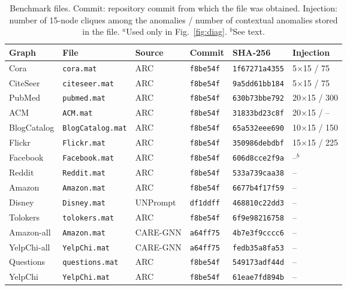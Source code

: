 \documentclass[pdflatex,sn-mathphys-ay]{sn-jnl}
\theoremstyle{plain}
\theoremstyle{remark}
\begin{document}
\begin{appendices}
\begin{table}[h]
\caption{Benchmark files. Commit: repository commit from which the file was obtained. Injection: number of 15-node cliques among the anomalies / number of contextual anomalies stored in the file. $^{a}$Used only in Fig.~\ref{fig:diag}. $^{b}$See text.}
\label{tab:files}
\scriptsize
\setlength{\tabcolsep}{2pt}
\begin{tabular*}{\textwidth}{@{\extracolsep{\fill}}llllll@{}}
\toprule
Graph & File & Source & Commit & SHA-256 & Injection \\
\midrule
Cora & \texttt{cora.mat} & ARC & \texttt{f8be54f} & \texttt{1f67271a4355} & 5$\times$15 / 75 \\
CiteSeer & \texttt{citeseer.mat} & ARC & \texttt{f8be54f} & \texttt{9a5dd61bb184} & 5$\times$15 / 75 \\
PubMed & \texttt{pubmed.mat} & ARC & \texttt{f8be54f} & \texttt{630b73bbe792} & 20$\times$15 / 300 \\
ACM & \texttt{ACM.mat} & ARC & \texttt{f8be54f} & \texttt{31833bd23c8f} & 20$\times$15 / -- \\
BlogCatalog & \texttt{BlogCatalog.mat} & ARC & \texttt{f8be54f} & \texttt{65a532eee690} & 10$\times$15 / 150 \\
Flickr & \texttt{Flickr.mat} & ARC & \texttt{f8be54f} & \texttt{350986debdbf} & 15$\times$15 / 225 \\
Facebook & \texttt{Facebook.mat} & ARC & \texttt{f8be54f} & \texttt{606d8cce2f9a} & --$^{b}$ \\
Reddit & \texttt{Reddit.mat} & ARC & \texttt{f8be54f} & \texttt{533a739caa38} & -- \\
Amazon & \texttt{Amazon.mat} & ARC & \texttt{f8be54f} & \texttt{6677b4f17f59} & -- \\
Disney & \texttt{Disney.mat} & UNPrompt & \texttt{df1ddff} & \texttt{468810c22dd3} & -- \\
Tolokers & \texttt{tolokers.mat} & ARC & \texttt{f8be54f} & \texttt{6f9e98216758} & -- \\
Amazon-all & \texttt{Amazon.mat} & CARE-GNN & \texttt{a64ff75} & \texttt{4b7e3f9cccc6} & -- \\
YelpChi-all & \texttt{YelpChi.mat} & CARE-GNN & \texttt{a64ff75} & \texttt{fedb35a8fa53} & -- \\
Questions & \texttt{questions.mat} & ARC & \texttt{f8be54f} & \texttt{549173adf44d} & -- \\
YelpChi & \texttt{YelpChi.mat} & ARC & \texttt{f8be54f} & \texttt{61eae7fd894b} & -- \\

\end{tabular*}
\end{table}
\end{appendices}
\end{document}
